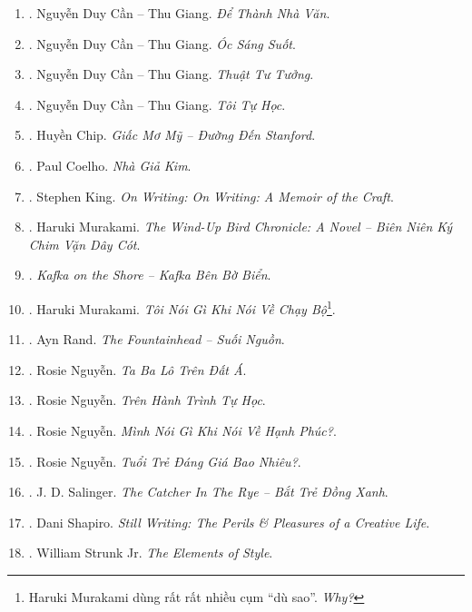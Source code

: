 \documentclass{article}
\begin{document}
\begin{enumerate}
	\item \cite{Can_dtnv}. Nguyễn Duy Cần -- Thu Giang. \textit{Để Thành Nhà Văn}.\hfill{\sf[done]}
	\item \cite{Can_oss}. Nguyễn Duy Cần -- Thu Giang. \textit{Óc Sáng Suốt}.\hfill{\sf[reading]}
	\item \cite{Can_ttt}. Nguyễn Duy Cần -- Thu Giang. \textit{Thuật Tư Tưởng}.\hfill{\sf[reading]}
	\item \cite{Can_tth}. Nguyễn Duy Cần -- Thu Giang. \textit{Tôi Tự Học}.\hfill{\sf[reading]}
	\item \cite{Chip2018}. Huyền Chip. \textit{Giấc Mơ Mỹ -- Đường Đến Stanford}.\hfill{\sf[done]}
	\item \cite{Coelho2023}. Paul Coelho. \textit{Nhà Giả Kim}.\hfill{\sf[done]}
	\item \cite{King2000, King2010}. Stephen King. \textit{On Writing: On Writing: A Memoir of the Craft}.\hfill{\sf[done]}
	\item \cite{Murakami_bird}. Haruki Murakami. \textit{The Wind-Up Bird Chronicle: A Novel -- Biên Niên Ký Chim Vặn Dây Cót}.\hfill{\sf[reading]}
	\item \cite{Murakami_Kafka}. \textit{Kafka on the Shore -- Kafka Bên Bờ Biển}.\hfill{\sf[reading]}
	\item \cite{Murakami_run}. Haruki Murakami. \textit{Tôi Nói Gì Khi Nói Về Chạy Bộ}\footnote{Haruki Murakami dùng rất rất nhiều cụm ``dù sao''. \textit{Why?}}.\hfill{\sf[done]}
	\item \cite{Rand_fountainhead}. Ayn Rand. \textit{The Fountainhead -- Suối Nguồn}.\hfill{\sf[done]}
	\item \cite{Rosie2021a}. Rosie Nguyễn. \textit{Ta Ba Lô Trên Đất Á}.\hfill{\sf[done]}
	\item \cite{Rosie2021b}. Rosie Nguyễn. \textit{Trên Hành Trình Tự Học}.\hfill{\sf[done]}
	\item \cite{Rosie2022a}. Rosie Nguyễn. \textit{Mình Nói Gì Khi Nói Về Hạnh Phúc?}.\hfill{\sf[done]}
	\item \cite{Rosie2022b}. Rosie Nguyễn. \textit{Tuổi Trẻ Đáng Giá Bao Nhiêu?}.\hfill{\sf[done]}
	\item \cite{Salinger_btdx}. J. D. Salinger. \textit{The Catcher In The Rye -- Bắt Trẻ Đồng Xanh}.\hfill{\sf[done]}
	\item \cite{Shapiro2014}. Dani Shapiro. \textit{Still Writing: The Perils \& Pleasures of a Creative Life}.\hfill{\sf[reading]}
	\item \cite{Strunk1918}. William Strunk Jr. \textit{The Elements of Style}.\hfill{\sf[done]}

\end{enumerate}
\end{document}
